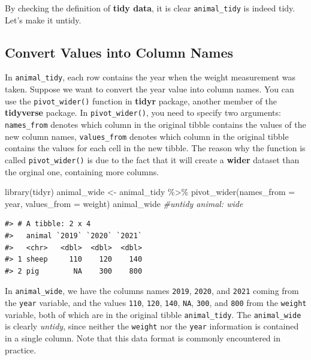 \documentclass[
]{book}
\newenvironment{Shaded}{\begin{snugshade}}{\end{snugshade}}
\newcommand{\AttributeTok}[1]{\textcolor[rgb]{0.77,0.63,0.00}{#1}}
\newcommand{\CommentTok}[1]{\textcolor[rgb]{0.56,0.35,0.01}{\textit{#1}}}
\newcommand{\FunctionTok}[1]{\textcolor[rgb]{0.00,0.00,0.00}{#1}}
\newcommand{\NormalTok}[1]{#1}
\newcommand{\OtherTok}[1]{\textcolor[rgb]{0.56,0.35,0.01}{#1}}
\newcommand{\SpecialCharTok}[1]{\textcolor[rgb]{0.00,0.00,0.00}{#1}}
\begin{document}
By checking the definition of \textbf{tidy data}, it is clear \texttt{animal\_tidy} is indeed tidy. Let's make it untidy.

\hypertarget{tidy-wide}{%
\subsection{Convert Values into Column Names}\label{tidy-wide}}

In \texttt{animal\_tidy}, each row contains the year when the weight measurement was taken. Suppose we want to convert the year value into column names. You can use the \texttt{pivot\_wider()} function in \textbf{tidyr} package, another member of the \textbf{tidyverse} package. In \texttt{pivot\_wider()}, you need to specify two arguments: \texttt{names\_from} denotes which column in the original tibble contains the values of the new column names, \texttt{values\_from} denotes which column in the original tibble contains the values for each cell in the new tibble. The reason why the function is called \texttt{pivot\_wider()} is due to the fact that it will create a \textbf{wider} dataset than the orginal one, containing more columns.

\begin{Shaded}
\begin{Highlighting}[]
\FunctionTok{library}\NormalTok{(tidyr)}
\NormalTok{animal\_wide }\OtherTok{\textless{}{-}}\NormalTok{ animal\_tidy }\SpecialCharTok{\%\textgreater{}\%} \FunctionTok{pivot\_wider}\NormalTok{(}\AttributeTok{names\_from =}\NormalTok{ year,                                  }\AttributeTok{values\_from =}\NormalTok{ weight) }
\NormalTok{animal\_wide   }\CommentTok{\#untidy animal: wide}
\end{Highlighting}
\end{Shaded}

\begin{verbatim}
#> # A tibble: 2 x 4
#>   animal `2019` `2020` `2021`
#>   <chr>   <dbl>  <dbl>  <dbl>
#> 1 sheep     110    120    140
#> 2 pig        NA    300    800
\end{verbatim}

In \texttt{animal\_wide}, we have the columns names \texttt{2019}, \texttt{2020}, and \texttt{2021} coming from the \texttt{year} variable, and the values \texttt{110}, \texttt{120}, \texttt{140}, \texttt{NA}, \texttt{300}, and \texttt{800} from the \texttt{weight} variable, both of which are in the original tibble \texttt{animal\_tidy}. The \texttt{animal\_wide} is clearly \emph{untidy}, since neither the \texttt{weight} nor the \texttt{year} information is contained in a single column. Note that this data format is commonly encountered in practice.
\end{document}
